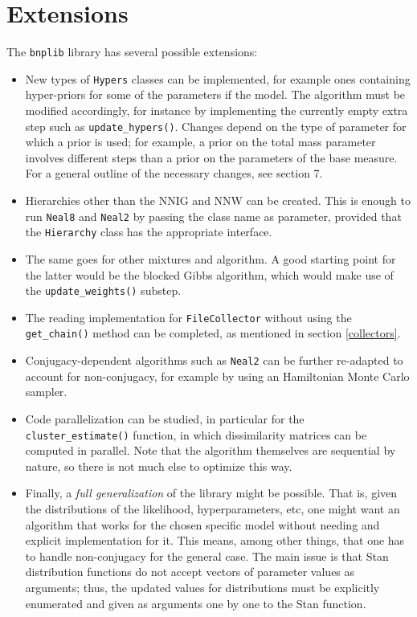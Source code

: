 \chapter{Extensions}
The \verb|bnplib| library has several possible extensions:
\begin{itemize}
	\item New types of \verb|Hypers| classes can be implemented, for example ones containing hyper-priors for some of the parameters if the model.
	The algorithm must be modified accordingly, for instance by implementing the currently empty extra step such as \verb|update_hypers()|.
	Changes depend on the type of parameter for which a prior is used; for example, a prior on the total mass parameter involves different steps than a prior on the parameters of the base measure.
	For a general outline of the necessary changes, see \cite{neal} section 7.
	\item Hierarchies other than the NNIG and NNW can be created.
	This is enough to run \verb|Neal8| and \verb|Neal2| by passing the class name as parameter, provided that the \verb|Hierarchy| class has the appropriate interface.
	\item The same goes for other mixtures and algorithm.
	A good starting point for the latter would be the blocked Gibbs algorithm, which would make use of the \verb|update_weights()| substep.
	\item The reading implementation for \verb|FileCollector| without using the \verb|get_chain()| method can be completed, as mentioned in section \ref{collectors}.
	\item Conjugacy-dependent algorithms such as \verb|Neal2| can be further re-adapted to account for non-conjugacy, for example by using an Hamiltonian Monte Carlo sampler.
	\item Code parallelization can be studied, in particular for the \verb|cluster_estimate()| function, in which dissimilarity matrices can be computed in parallel.
	Note that the algorithm themselves are sequential by nature, so there is not much else to optimize this way.
	\item Finally, a \emph{full generalization} of the library might be possible.
	That is, given the distributions of the likelihood, hyperparameters, etc, one might want an algorithm that works for the chosen specific model without needing and explicit implementation for it.
	This means, among other things, that one has to handle non-conjugacy for the general case.
	The main issue is that Stan distribution functions do not accept vectors of parameter values as arguments; thus, the updated values for distributions must be explicitly enumerated and given as arguments one by one to the Stan function.

\end{itemize}
